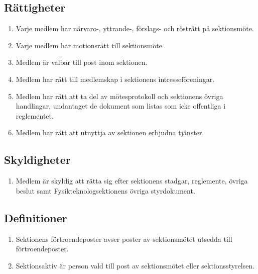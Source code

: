 \documentclass[11pt,a4paper]{article}
\begin{document}
\subsection{Rättigheter}

\begin{enumerate}[\thesubsection .1]

   \item Varje medlem har närvaro-, yttrande-, förslags- och rösträtt
   på sektionsmöte.
   
   \item Varje medlem har motionsrätt till sektionsmöte

   \item Medlem är valbar till post inom sektionen.

   \item Medlem har rätt till medlemskap i sektionens intresseföreningar.

   \item Medlem har rätt att ta del av mötesprotokoll och sektionens
   övriga handlingar, undantaget de dokument som listas som icke offentliga i reglementet. 
   \item Medlem har rätt att utnyttja av sektionen erbjudna tjänster.

\end{enumerate}

\subsection{Skyldigheter}

\begin{enumerate}[\thesubsection .1]

   \item Medlem är skyldig att rätta sig efter sektionens stadgar,
   regle\-mente,
   övriga beslut samt  Fysikteknologsektionens övriga styrdokument.

\end{enumerate}

\subsection{Definitioner}

\begin{enumerate}[\thesubsection .1]

\item Sektionens förtroendeposter avser poster av sektionsmötet utsedda till förtroendeposter.

\item Sektionsaktiv är person vald till post av sektionsmötet eller sektionsstyrelsen.
\end{enumerate}
\end{document}
